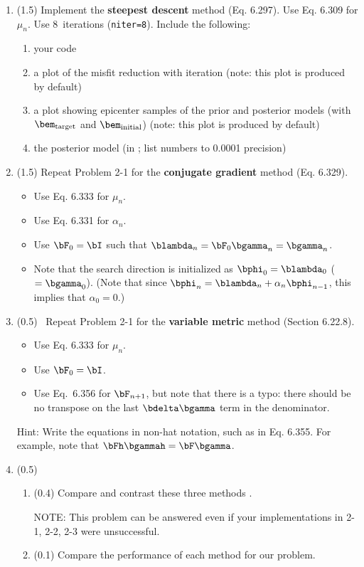 \documentclass[11pt,titlepage,fleqn]{article}
\begin{document}
\begin{enumerate}
\item (1.5) Implement the {\bf steepest descent} method (Eq. 6.297). Use Eq. 6.309 for $\mu_n$. Use 8~iterations (\verb+niter=8+). Include the following:
%
\begin{enumerate}
\item your code
\item a plot of the misfit reduction with iteration (note: this plot is produced by default)
\item a plot showing epicenter samples of the prior and posterior models (with $\bem_{\rm target}$ and $\bem_{\rm initial}$) (note: this plot is produced by default)
\item the posterior model (in ; list numbers to 0.0001 precision)
\end{enumerate}

\label{steep}

\item (1.5) Repeat Problem 2-1 for the {\bf conjugate gradient} method (Eq. 6.329).
%
\begin{itemize}
\item Use Eq. 6.333 for $\mu_n$.
\item Use Eq. 6.331 for $\alpha_n$.
\item Use $\bF_0 = \bI$ such that $\blambda_n = \bF_0\bgamma_n = \bgamma_n$. 
\item Note that the search direction is initialized as $\bphi_0 = \blambda_0$ ($= \bgamma_0$). (Note that since $\bphi_n = \blambda_n + \alpha_n\bphi_{n-1}$, this implies that $\alpha_0 = 0$.)
\end{itemize}

\item (0.5) \ptag\ Repeat Problem 2-1 for the {\bf variable metric} method (Section 6.22.8).
%
\begin{itemize}
\item Use Eq. 6.333 for $\mu_n$.
\item Use $\bF_0 = \bI$.
\item Use Eq.~6.356 for $\bF_{n+1}$, but note that there is a typo: there should be no transpose on the last $\bdelta\bgamma$ term in the denominator.
\end{itemize}
%
Hint: Write the equations in non-hat notation, such as in Eq. 6.355. For example, note that $\bFh\bgammah = \bF\bgamma$.

\item (0.5)
%
\begin{enumerate}
\item (0.4) Compare and contrast these three methods \citep[see][]{Tarantola2005}.

NOTE: This problem can be answered even if your implementations in 2-1, 2-2, 2-3 were unsuccessful.

\item (0.1) Compare the performance of each method for our problem.
\end{enumerate}

\end{enumerate}
\end{document}

